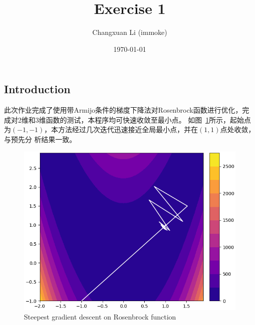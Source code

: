\documentclass[letterpaper]{article}
\title{Exercise 1}
\author{Changxuan Li (immoke)}
\date{\today}
\begin{document}
\maketitle

\begin{CJK*}{UTF8}{gbsn}
\section{Introduction}
此次作业完成了使用带Armijo条件的梯度下降法对Rosenbrock函数进行优化，完成对2维和3维函数的测试，本程序均可快速收敛至最小点。
如图~\ref{fig:result}所示，起始点为$(-1,-1)$，本方法经过几次迭代迅速接近全局最小点，并在$(1,1)$点处收敛，与预先分
析结果一致。
\end{CJK*}
\begin{figure}[h]
    \centering
    \includegraphics[width=\textwidth]{../media/2D_inexact.png}
    \caption{Steepest gradient descent on Rosenbrock function}
    \label{fig:result}
\end{figure}
\end{document}
